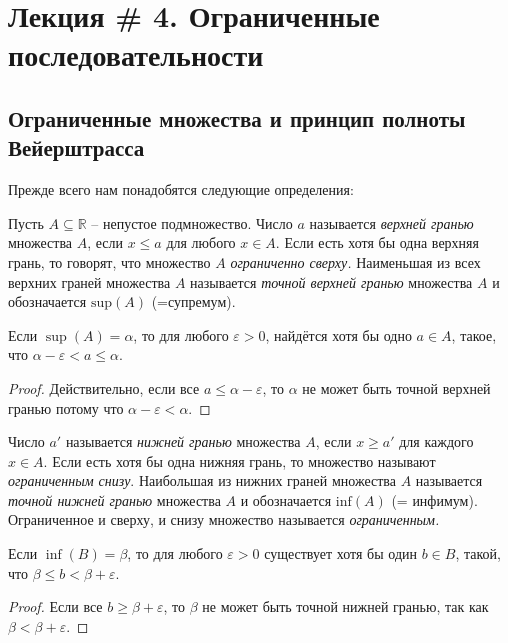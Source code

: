 \section{Лекция \# 4. Ограниченные последовательности}

\subsection{Ограниченные множества и принцип полноты Вейерштрасса}

Прежде всего нам понадобятся следующие определения:

\begin{definition}\label{sup,inf}
    Пусть $A \subseteq \mathbb{R}$ -- непустое подмножество. Число $a$ называется \textit{верхней гранью} множества $A$, если $x\le a$ для любого $x \in A$. Если есть хотя бы одна верхняя грань, то говорят, что множество $A$ \textit{ограниченно сверху.} Наименьшая из всех верхних граней множества $A$ называется \textit{точной верхней гранью} множества $A$ и обозначается $\mathrm{sup}(A)$ (=супремум).
\end{definition}

\begin{lemma}
 Если $\sup (A) = \alpha$, то для любого $\varepsilon>0$, найдётся хотя бы одно $a \in A$, такое, что $\alpha - \varepsilon < a \le \alpha.$
\end{lemma}
\begin{proof}
    Действительно, если все $a \le \alpha - \varepsilon$, то $\alpha$ не может быть точной верхней гранью потому что $\alpha - \varepsilon < \alpha.$
\end{proof}

\begin{definition}
Число $a'$ называется \textit{нижней гранью} множества $A$, если $x \ge a'$ для каждого $x \in A$. Если есть хотя бы одна нижняя грань, то множество называют \textit{ограниченным снизу}. Наибольшая из нижних граней множества $A$ называется \textit{точной нижней гранью} множества $A$ и обозначается $\mathrm{inf}(A)$ (= инфимум).
    Ограниченное и сверху, и снизу множество называется \textit{ограниченным.}
\end{definition}

\begin{lemma}
    Если $\inf(B) = \beta$, то для любого $\varepsilon>0$ существует хотя бы один $b\in B$, такой, что $\beta \le b < \beta + \varepsilon.$
\end{lemma}
\begin{proof}
 Если все $b \ge \beta +\varepsilon$, то $\beta$ не может быть точной нижней гранью, так как $\beta < \beta + \varepsilon.$
\end{proof}


